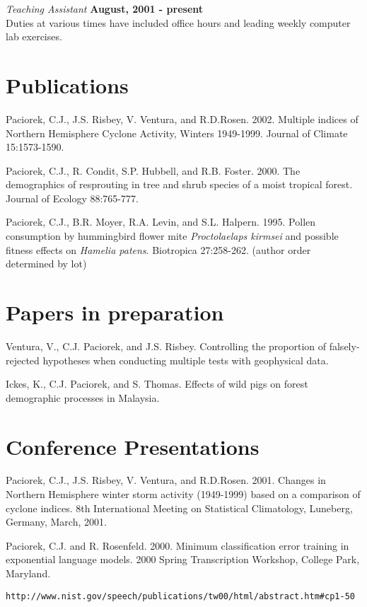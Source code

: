 \documentclass[margin,line]{res}
\begin{document}
\begin{resume}
{\em Teaching Assistant} \hfill {\bf August, 2001  - present}\\
Duties at various times have included
office hours and leading weekly computer lab exercises.



\section{\sc Publications}
Paciorek, C.J., J.S. Risbey, V. Ventura, and R.D.Rosen. 2002. Multiple indices of Northern Hemisphere Cyclone
Activity, Winters 1949-1999. Journal of Climate 15:1573-1590.

Paciorek, C.J., R. Condit, S.P. Hubbell, and R.B. Foster.  2000.
The demographics of resprouting in tree and shrub species of a moist
tropical forest.  Journal of Ecology 88:765-777.

Paciorek, C.J., B.R. Moyer, R.A. Levin, and S.L. Halpern.  1995.
Pollen consumption by hummingbird flower mite {\it Proctolaelaps
  kirmsei} and possible fitness effects on {\it Hamelia patens}.
Biotropica 27:258-262.  (author order determined by lot)

\section{\sc Papers in preparation}

Ventura, V., C.J. Paciorek, and J.S. Risbey.  Controlling the proportion of falsely-rejected hypotheses when conducting multiple tests with geophysical data.

Ickes, K., C.J. Paciorek, and S. Thomas.  Effects of wild pigs on
forest demographic processes in Malaysia.

\section{\sc Conference Presentations}
Paciorek, C.J., J.S. Risbey, V. Ventura, and R.D.Rosen.  2001.  Changes in Northern Hemisphere winter storm activity (1949-1999) based
on a comparison of cyclone indices.  8th International Meeting on
Statistical Climatology, Luneberg, Germany, March, 2001.

Paciorek, C.J. and R. Rosenfeld.  2000.  Minimum classification error
training in exponential language models.  2000 Spring Transcription
Workshop, College Park, Maryland.
\vspace*{-.25in}
\begin{verbatim}http://www.nist.gov/speech/publications/tw00/html/abstract.htm#cp1-50\end{verbatim}


\end{resume}
\end{document}
